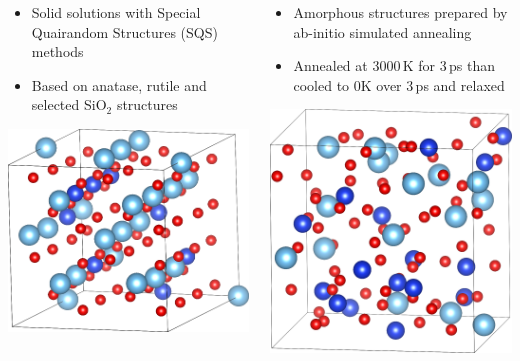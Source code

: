 \documentclass[noamsthm,8pt,t]{beamer}
\begin{document}
\begin{frame}
   \begin{columns}
      \begin{column}{0.5\textwidth}
         \begin{itemize}
            \item Solid solutions with Special Quairandom Structures (SQS) methods
            \item Based on anatase, rutile and selected SiO$_2$ structures
         \end{itemize}
         \vspace{0.2cm}
         \begin{center}
             \includegraphics[width=0.6\linewidth]{figures/SQS.png}
         \end{center}
      \end{column}

      \pause

      \begin{column}{0.5\textwidth}
         \begin{itemize}
            \item Amorphous structures prepared by ab-initio simulated annealing
            \item Annealed at 3000\,K for 3\,ps than cooled to 0K over 3\,ps and relaxed
         \end{itemize}
         \begin{center}
            \includegraphics[width=0.5\linewidth]{figures/am-SA.png}
         \end{center}
      \end{column}
   \end{columns}
\end{frame}
\end{document}

